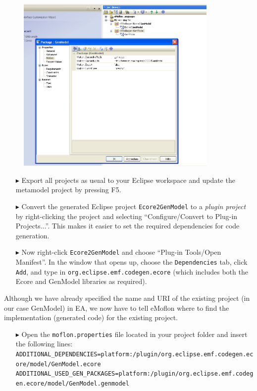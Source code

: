 \begin{figure}[htbp]
\begin{center}  \includegraphics[width=0.87\textwidth]{pics/Ecore2GenModel/8_nsUriPre.png}
  \caption{}  
  \label{fig_customNS}
\end{center}
\end{figure}

\begin{enumerate}
\item[$\blacktriangleright$] Export all projects as usual to your Eclipse workspace and update the metamodel project by pressing \textsf{F5}.
\item[$\blacktriangleright$] Convert the generated Eclipse project \texttt{Ecore2GenModel} to a \emph{plugin project} by right-clicking the project and selecting ``Configure/Convert to Plug-in Projects...''.
This makes it easier to set the required dependencies for code generation.
\item[$\blacktriangleright$] Now right-click \texttt{Ecore2GenModel} and choose ``Plug-in Tools/Open Manifest''.
In the window that opens up, choose the \texttt{Dependencies} tab, click \texttt{Add}, and type in \texttt{org.eclipse.emf.codegen.ecore} (which includes both the \textsf{Ecore} and \textsf{GenModel} libraries as required).
\end{enumerate}

Although we have already specified the name and URI of the existing project (in our case \textsf{GenModel}) in EA, we now have to tell eMoflon where to find the implementation (generated code) for the existing project. 
\begin{enumerate}
\item[$\blacktriangleright$] Open the \texttt{moflon.properties} file located in your project folder and insert the following lines:\\
\texttt{{\tiny ADDITIONAL\_DEPENDENCIES=platform:/plugin/org.eclipse.emf.codegen.ecore/model/GenModel.ecore}}\\
\texttt{{\tiny ADDITIONAL\_USED\_GEN\_PACKAGES=platform:/plugin/org.eclipse.emf.codegen.ecore/model/GenModel.genmodel}}
\end{enumerate}

